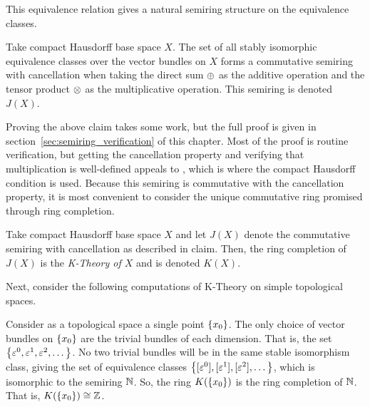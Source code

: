 \documentclass[../sean_thesis.tex]{subfiles}
\begin{document}
This equivalence relation gives a natural semiring structure on the equivalence classes.

\begin{claim}
\label{thm:k_theory_semiring}
	Take compact Hausdorff base space $X$. The set of all stably isomorphic equivalence classes over the vector bundles on $X$ forms a commutative semiring with cancellation when taking the direct sum $\oplus$ as the additive operation and the tensor product $\otimes$ as the multiplicative operation. This semiring is denoted $J(X)$.
\end{claim}

Proving the above claim takes some work, but the full proof is given in section~\ref{sec:semiring_verification} of this chapter. Most of the proof is routine verification, but getting the cancellation property and verifying that multiplication is well-defined appeals to , which is where the compact Hausdorff condition is used. Because this semiring is commutative with the cancellation property, it is most convenient to consider the unique commutative ring promised through ring completion.

\begin{definition}
	Take compact Hausdorff base space $X$ and let $J(X)$ denote the commutative semiring with cancellation as described in claim. Then, the ring completion of $J(X)$ is the \emph{K-Theory of $X$} and is denoted $K(X)$.
\end{definition}

Next, consider the following computations of K-Theory on simple topological spaces.

\begin{example}
	Consider as a topological space a single point $\left\{x_0\right\}$. The only choice of vector bundles on $\left\{x_0\right\}$ are the trivial bundles of each dimension. That is, the set $\left\{\varepsilon^{0}, \varepsilon^{1}, \varepsilon^{2}, \dots\right\}$. No two trivial bundles will be in the same stable isomorphism class, giving the set of equivalence classes $\left\{[\varepsilon^{0}], [\varepsilon^{1}], [\varepsilon^{2}], \dots\right\}$, which is isomorphic to the semiring $\mathbb{N}$. So, the ring $K(\left\{x_0\right\})$ is the ring completion of $\mathbb{N}$. That is, $K(\left\{x_0\right\}) \cong \mathbb{Z}$.
\end{example}
\end{document}
